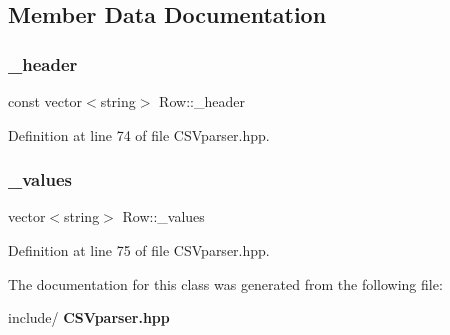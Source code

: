 \subsection{Member Data Documentation}
\mbox{\label{class_row_a98603a15923aa97e15198393ef3080c0}} 
\subsubsection{\_header}
{\footnotesize\ttfamily const vector$<$string$>$ Row\+::\+\_\+header\hspace{0.3cm}{\ttfamily [private]}}



Definition at line 74 of file C\+S\+Vparser.\+hpp.

\mbox{\label{class_row_ab064db33f941055c8d99a6f47eae733c}} 
\subsubsection{\_values}
{\footnotesize\ttfamily vector$<$string$>$ Row\+::\+\_\+values\hspace{0.3cm}{\ttfamily [private]}}



Definition at line 75 of file C\+S\+Vparser.\+hpp.



The documentation for this class was generated from the following file\+:\begin{DoxyCompactItemize}
\item 
include/\textbf{ C\+S\+Vparser.\+hpp}\end{DoxyCompactItemize}
